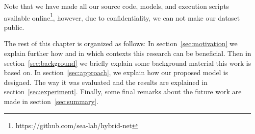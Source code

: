 Note that we have made all our source code, models, and execution scripts available online\footnote{https://github.com/sea-lab/hybrid-net}, however, due to confidentiality, we can not make our dataset public. 

The rest of this chapter is organized as follows: In section~\ref{sec:motivation} we explain further how and in which contexts this research can be beneficial. Then in section~\ref{sec:background} we briefly explain some background material this work is based on. In section~\ref{sec:approach}, we explain how our proposed model is designed. The way it was evaluated and the results are explained in section~\ref{sec:experiment}. 
Finally,
some final remarks about the future work are made in section~\ref{sec:summary}.